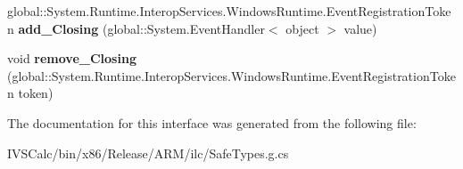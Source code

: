 \begin{DoxyCompactItemize}
\mbox{\label{interface_windows_1_1_u_i_1_1_xaml_1_1_controls_1_1_i_app_bar3_a6e424fac8c7cec71bad623c7c5e8ebd3}} 
global\+::\+System.\+Runtime.\+Interop\+Services.\+Windows\+Runtime.\+Event\+Registration\+Token {\bfseries add\+\_\+\+Closing} (global\+::\+System.\+Event\+Handler$<$ object $>$ value)
\item 
\mbox{\label{interface_windows_1_1_u_i_1_1_xaml_1_1_controls_1_1_i_app_bar3_aac12730dbba64fc7499059fd3646d24d}} 
void {\bfseries remove\+\_\+\+Closing} (global\+::\+System.\+Runtime.\+Interop\+Services.\+Windows\+Runtime.\+Event\+Registration\+Token token)
\end{DoxyCompactItemize}


The documentation for this interface was generated from the following file\+:\begin{DoxyCompactItemize}
\item 
I\+V\+S\+Calc/bin/x86/\+Release/\+A\+R\+M/ilc/Safe\+Types.\+g.\+cs\end{DoxyCompactItemize}
